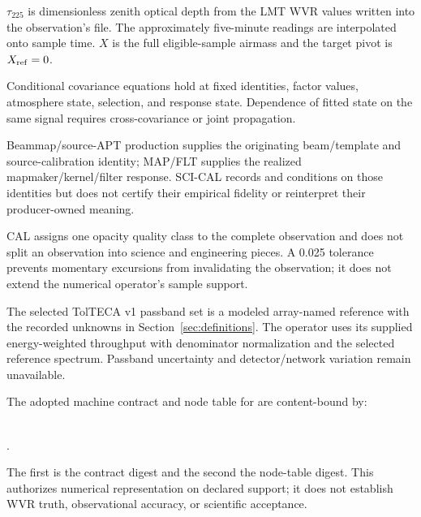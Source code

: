\begin{description}[style=nextline]
\item[\Assump{006}: atmosphere inputs.]
  \(\tau_{225}\) is dimensionless zenith optical depth from the LMT WVR values
  written into the observation's  file. The approximately
  five-minute readings are interpolated onto sample time. $X$ is the full
  eligible-sample airmass and the target pivot is $X_{\rm ref}=0$.

\item[\Assump{007}: fixed conditional state.]
  Conditional covariance equations hold at fixed identities, factor values,
  atmosphere state, selection, and response state. Dependence of fitted state
  on the same signal requires cross-covariance or joint propagation.

\item[\Assump{008}: response ownership.]
  Beammap/source-APT production supplies the originating beam/template and
  source-calibration identity; MAP/FLT supplies the realized
  mapmaker/kernel/filter response. SCI-CAL records and conditions on those
  identities but does not certify their empirical fidelity or reinterpret
  their producer-owned meaning.

\item[\Assump{009}: coherent observation class.]
  CAL assigns one opacity quality class to the complete observation and does
  not split an observation into science and engineering pieces. A 0.025
  tolerance prevents momentary excursions from invalidating the observation;
  it does not extend the numerical operator's sample support.

\item[\Assump{010}: passband limitation.]
  The selected TolTECA v1 passband set is a modeled array-named reference with
  the recorded unknowns in Section~\ref{sec:definitions}. The operator uses
  its supplied energy-weighted throughput with denominator normalization and
  the selected reference spectrum. Passband uncertainty and detector/network
  variation remain unavailable.

\item[\Assump{011}: content-bound numeric operator authority.]
  The adopted machine contract and node table for
   are content-bound by:
  \begin{center}\footnotesize
  \\
  .
  \end{center}
  The first is the contract digest and the second the node-table digest.
  This authorizes numerical representation on declared support; it does not
  establish WVR truth, observational accuracy, or scientific acceptance.
\end{description}
